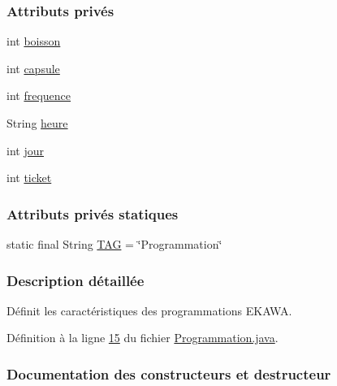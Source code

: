 \subsubsection*{Attributs privés}
\begin{DoxyCompactItemize}
\item 
int \hyperlink{classcom_1_1example_1_1ekawa_1_1_programmation_a625a85ed4d0b16f52382fd458e0e5657}{boisson}
\item 
int \hyperlink{classcom_1_1example_1_1ekawa_1_1_programmation_a97573a66f9b2821a7445c69f346a5298}{capsule}
\item 
int \hyperlink{classcom_1_1example_1_1ekawa_1_1_programmation_a6d0fd682b51727025ed8c4bf35fc8980}{frequence}
\item 
String \hyperlink{classcom_1_1example_1_1ekawa_1_1_programmation_abfff674f6cd5f76ea4b8c37e8c558ffa}{heure}
\item 
int \hyperlink{classcom_1_1example_1_1ekawa_1_1_programmation_a96605063cb4177fa382b1ce2388f544f}{jour}
\item 
int \hyperlink{classcom_1_1example_1_1ekawa_1_1_programmation_a54ce49550025f7f5e5080f0548b08653}{ticket}
\end{DoxyCompactItemize}
\subsubsection*{Attributs privés statiques}
\begin{DoxyCompactItemize}
\item 
static final String \hyperlink{classcom_1_1example_1_1ekawa_1_1_programmation_a85d255c2386eb6751905a45dba634742}{T\+AG} = \char`\"{}Programmation\char`\"{}
\end{DoxyCompactItemize}


\subsubsection{Description détaillée}
Définit les caractéristiques des programmations E\+K\+A\+WA. 

Définition à la ligne \hyperlink{_programmation_8java_source_l00015}{15} du fichier \hyperlink{_programmation_8java_source}{Programmation.\+java}.



\subsubsection{Documentation des constructeurs et destructeur}
\mbox{\label{classcom_1_1example_1_1ekawa_1_1_programmation_a9119f0bd9f104d0fbccdff1ab1f0eb64}} 
